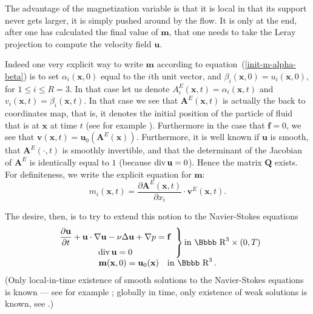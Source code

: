 \documentclass[12pt,twoside]{article}
\newcommand{\bA}{\mathbf{A}}
\renewcommand {\div}{{\rm div}\,}
\newcommand {\rdd}{\mbox{\Bbbb R}}
\newcommand {\bv}{{\mathbf{v}}}
\newcommand {\bu}{{\mathbf{u}}}
\newcommand {\bff}{{\mathbf{f}}}
\newcommand {\bx}{{\mathbf{x}}}
\newcommand {\bm}{{\mathbf{m}}}
\newcommand {\bQ}{{\mathbf{Q}}}
\newcommand {\pder}[2]{\frac {\partial #1}{\partial #2}}
\begin{document}
The advantage of the magnetization variable is that it is local in that
its support never gets larger, it is simply pushed around by the flow.
It is only at the end, after one has calculated the final value of
$\bm$, that one needs to take the Leray projection to compute
the velocity field $\bu$.

Indeed one very explicit way to write $\bm$ according to 
equation~(\ref{init-m-alpha-beta}) is to set $\alpha_i(\bx,0)$
equal to the $i$th unit vector, and $\beta_i(\bx,0) = u_i(\bx,0)$, 
for $1 \le i \le R = 3$.  In that case
let us denote $A^E_i(\bx,t) = \alpha_i(\bx,t)$ and 
$v_i(\bx,t) = \beta_i(\bx,t)$.  In that case we see that
$\bA^E(\bx,t)$ is actually the
back to coordinates map, that is, it denotes the initial position of the
particle of fluid that is at $\bx$ at time $t$ (see for example \cite{Ch}).  
Furthermore
in the case that $\bff = 0$, we see that $\bv(\bx,t) = \bu_0(\bA^E(\bx))$.
Furthermore, it is well known if $\bu$ is smooth, that
$\bA^E(\cdot,t)$ is smoothly invertible, and that the determinant of the 
Jacobian of $\bA^E$ is identically equal to $1$ (because $\div \bu = 0$).  
Hence the matrix $\bQ$ exists.  For definiteness, we
write the explicit equation for
$\bm$:
\begin{equation} \label{m-A-v}%
m_i(\bx,t) = \pder{\bA^E(\bx, t)}{x_i} \cdot \bv^E(\bx, t) .
\end{equation}

The desire, then, is to try to extend this notion to the Navier-Stokes
equations
\begin{equation} \label{navier-stokes-u}%
\begin{array}{c}
\left. \begin{array}{c}
\displaystyle \pder{\bu}{t} + \bu\cdot \nabla \bu - \nu \Delta \bu + \nabla p = \bff \\[6pt]
\div \bu = 0 
\end{array} \right\} {\rm in \ } \rdd^3 \times (0,T) \\[10pt]
\bm(\bx,0) = \bu_0(\bx) \quad {\rm in \ } \rdd^3\, .
\end{array}
\end{equation}
(Only local-in-time existence of smooth solutions to the Navier-Stokes 
equations is known --- see for example \cite{KiLa}; 
globally in time, only  existence 
of weak solutions is known, see \cite{Le}.)
\end{document}
